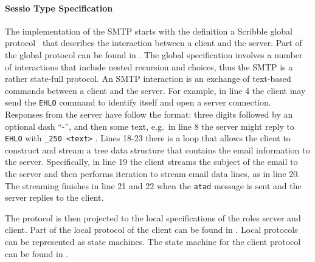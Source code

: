
\paragraph{Sessio Type Specification}
The implementation of the SMTP starts with
the definition a Scribble global protocol~\cite{HuR:smtp}
that describes the interaction between a client and the server.
Part of the global protocol can be found in
.
The global specification involves a number of interactions
that include nested recursion and choices, thus the SMTP
is a rather state-full protocol.
%
An SMTP interaction is an exchange of text-based {commands}
between a client and the server.
%
For example, in line 4 the client may send the
\lstinline|EHLO| command to identify itself and open a server connection.
Responses from the server have follow  the format:
three digits followed by an optional dash ``-'', and then some text,
e.g.~in line 8 the server might reply to \lstinline|EHLO| with \lstinline|_250 <text>| .
%
%
%
Lines 18-23 there is a loop that allows the client to construct
and stream a tree data structure that contains the email information
to the server. Specifically, in line 19 the client streams the subject of the
email to the server and then performs iteration to stream email data lines,
as in line 20. The streaming finishes in line 21 and 22 when the
\lstinline|atad| message is sent and the server replies to the client.

The protocol is then projected to the local specifications
of the roles server and client. Part of the local protocol
of the client can be found in .
Local protocols can be represented as state machines. The state
machine for the client protocol can be found in .

